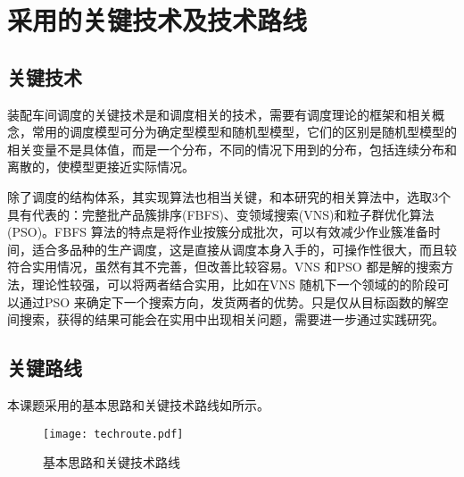 \chapter{采用的关键技术及技术路线}
\section{关键技术}
装配车间调度的关键技术是和调度相关的技术，需要有调度理论的框架和相关概念，常用的调度模型可分为确定型模型和随机型模型，它们的区别是随机型模型的相关变量不是具体值，而是一个分布，不同的情况下用到的分布，包括连续分布和离散的，使模型更接近实际情况。

除了调度的结构体系，其实现算法也相当关键，和本研究的相关算法中，选取3个具有代表的：完整批产品簇排序(FBFS)、变领域搜索(VNS)和粒子群优化算法(PSO)。FBFS 算法的特点是将作业按簇分成批次，可以有效减少作业簇准备时间，适合多品种的生产调度，这是直接从调度本身入手的，可操作性很大，而且较符合实用情况，虽然有其不完善，但改善比较容易。VNS 和PSO 都是解的搜索方法，理论性较强，可以将两者结合实用，比如在VNS 随机下一个领域的的阶段可以通过PSO 来确定下一个搜索方向，发货两者的优势。只是仅从目标函数的解空间搜索，获得的结果可能会在实用中出现相关问题，需要进一步通过实践研究。
\section{关键路线}
本课题采用的基本思路和关键技术路线如所示。
\begin{figure}[h]
\centering
\texttt{[image: techroute.pdf]}
\caption{基本思路和关键技术路线\label{fig:1}}
\end{figure}
